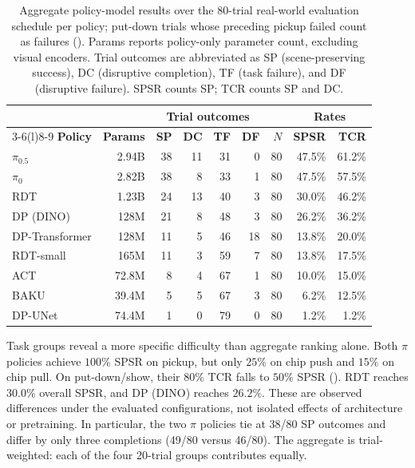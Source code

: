 \begin{table}[t]
    \caption{Aggregate policy-model results over the 80-trial real-world evaluation schedule per policy; put-down trials whose preceding pickup failed count as failures (). Params reports policy-only parameter count, excluding visual encoders. Trial outcomes are abbreviated as SP (scene-preserving success), DC (disruptive completion), TF (task failure), and DF (disruptive failure). SPSR counts SP; TCR counts SP and DC.}
    \label{tab:policy_model_results_summary}
    \centering
    \small
    \setlength{\tabcolsep}{3pt}
    \renewcommand{\arraystretch}{1.08}
    \begin{tabular*}{\linewidth}{@{\extracolsep{\fill}}lrrrrrrrr@{}}
        \toprule
        & & \multicolumn{4}{c}{\textbf{Trial outcomes}} & & \multicolumn{2}{c}{\textbf{Rates}} \\
        \cmidrule(lr){3-6}\cmidrule(l){8-9}
        \textbf{Policy} & \textbf{Params} & \textbf{SP} & \textbf{DC} & \textbf{TF} & \textbf{DF} & \textbf{$N$} & \textbf{SPSR} & \textbf{TCR} \\
        \midrule
        $\pi_{0.5}$ & 2.94B & 38 & 11 & 31 & 0 & 80 & 47.5\% & 61.2\% \\
        $\pi_0$ & 2.82B & 38 & 8 & 33 & 1 & 80 & 47.5\% & 57.5\% \\
        RDT & 1.23B & 24 & 13 & 40 & 3 & 80 & 30.0\% & 46.2\% \\
        DP (DINO) & 128M & 21 & 8 & 48 & 3 & 80 & 26.2\% & 36.2\% \\
        DP-Transformer & 128M & 11 & 5 & 46 & 18 & 80 & 13.8\% & 20.0\% \\
        RDT-small & 165M & 11 & 3 & 59 & 7 & 80 & 13.8\% & 17.5\% \\
        ACT & 72.8M & 8 & 4 & 67 & 1 & 80 & 10.0\% & 15.0\% \\
        BAKU & 39.4M & 5 & 5 & 67 & 3 & 80 & 6.2\% & 12.5\% \\
        DP-UNet & 74.4M & 1 & 0 & 79 & 0 & 80 & 1.2\% & 1.2\% \\
        \bottomrule
    \end{tabular*}
    \vspace{-1.0em}
\end{table}

Task groups reveal a more specific difficulty than aggregate ranking alone. Both $\pi$ policies achieve $100\%$ SPSR on pickup, but only $25\%$ on chip push and $15\%$ on chip pull. On put-down/show, their $80\%$ TCR falls to $50\%$ SPSR (). RDT reaches $30.0\%$ overall SPSR, and DP (DINO) reaches $26.2\%$. These are observed differences under the evaluated configurations, not isolated effects of architecture or pretraining. In particular, the two $\pi$ policies tie at 38/80 SP outcomes and differ by only three completions (49/80 versus 46/80). The aggregate is trial-weighted: each of the four 20-trial groups contributes equally.

